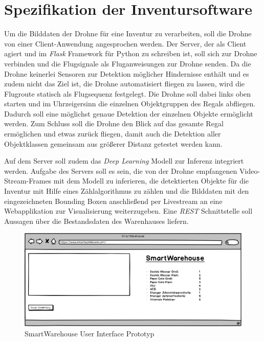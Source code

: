 \section{Spezifikation der Inventursoftware} \label{software}

Um die Bilddaten der Drohne für eine Inventur zu verarbeiten, soll die Drohne von einer Client-Anwendung angesprochen werden. Der Server, der als Client agiert und im \textit{Flask} Framework für Python zu schreiben ist, soll sich zur Drohne verbinden und die Flugsignale als Fluganweisungen zur Drohne senden. Da die Drohne keinerlei Sensoren zur Detektion möglicher Hindernisse enthält und es zudem nicht das Ziel ist, die Drohne automatisiert fliegen zu lassen, wird die Flugroute statisch als Flugsequenz festgelegt. Die Drohne soll dabei links oben starten und im Uhrzeigersinn die einzelnen Objektgruppen des Regals abfliegen. Dadurch soll eine möglichst genaue Detektion der einzelnen Objekte ermöglicht werden. Zum Schluss soll die Drohne den Blick auf das gesamte Regal ermöglichen und etwas zurück fliegen, damit auch die Detektion aller Objektklassen gemeinsam aus größerer Distanz getestet werden kann.

Auf dem Server soll zudem das \textit{Deep Learning} Modell zur Inferenz integriert werden. Aufgabe des Servers soll es sein, die von der Drohne empfangenen Video-Stream-Frames mit dem Modell zu inferieren, die detektierten Objekte für die Inventur mit Hilfe eines Zählalgorithmus zu zählen und die Bilddaten mit den eingezeichneten Bounding Boxen anschließend per Livestream an eine Webapplikation zur Visualisierung weiterzugeben. Eine \textit{REST} Schnittstelle soll Aussagen über die Bestandsdaten des Warenhauses liefern.

\begin{figure}[H]
	\begin{center}
		\includegraphics[width=15cm]{Bilder/UI.png} 
		\caption[SmartWarehouse User Interface Prototyp]{SmartWarehouse User Interface Prototyp}
		\label{ui}
	\end{center}
\end{figure}

